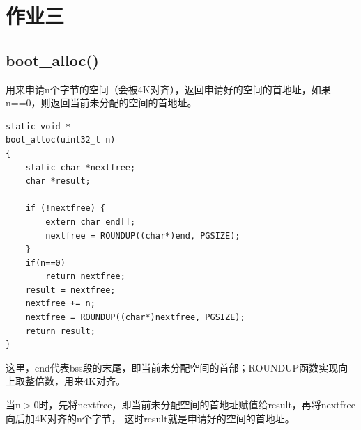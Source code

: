 \documentclass[12pt,a4paper,UTF8]{article}
\begin{document}


\section{作业三}

    \subsection{boot\_alloc()}
    用来申请n个字节的空间（会被4K对齐），返回申请好的空间的首地址，如果n==0，则返回当前未分配的空间的首地址。

    \begin{lstlisting}[style=CPP]
static void *
boot_alloc(uint32_t n)
{
	static char *nextfree;
	char *result;

	if (!nextfree) {
		extern char end[];
		nextfree = ROUNDUP((char*)end, PGSIZE);
	}
	if(n==0)
		return nextfree;
	result = nextfree;
	nextfree += n;
	nextfree = ROUNDUP((char*)nextfree, PGSIZE);
	return result;
}
    \end{lstlisting}

    这里，end代表bss段的末尾，即当前未分配空间的首部；ROUNDUP函数实现向上取整倍数，用来4K对齐。
    
    当n$>$0时，先将nextfree，即当前未分配空间的首地址赋值给result，再将nextfree向后加4K对齐的n个字节，
    这时result就是申请好的空间的首地址。
\end{document}
